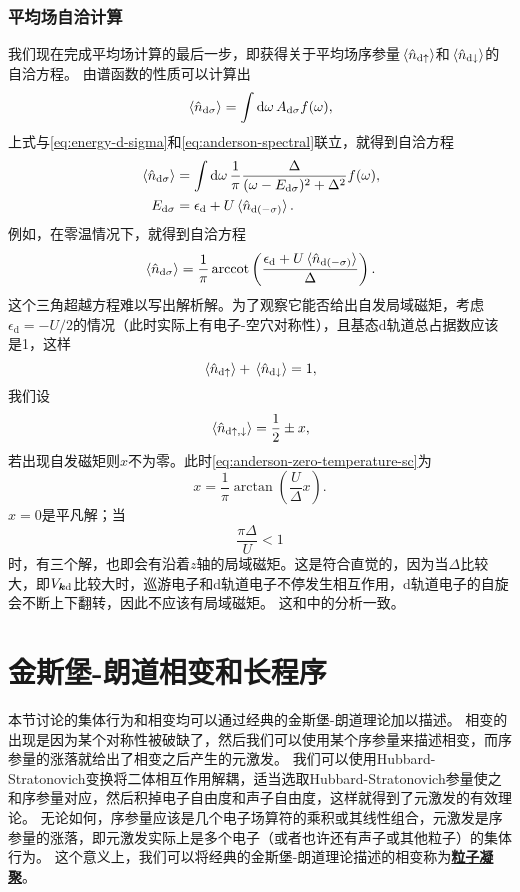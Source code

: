 \documentclass[hyperref, UTF8, a4paper]{ctexart}
\renewcommand{\autoref}{\prettyref}
\newcommand*{\concept}[1]{\underline{\textbf{#1}}}
\begin{document}
\subsubsection{平均场自洽计算}

我们现在完成平均场计算的最后一步，即获得关于平均场序参量$\expval*{\hat{n}_{\text{d} \uparrow}}$和$\expval*{\hat{n}_{\text{d} \downarrow}}$的自洽方程。
由谱函数的性质可以计算出
\[
    \expval*{\hat{n}_{\text{d} \sigma}} = \int \dd{\omega} A_{\text{d} \sigma} f(\omega),
\]
上式与\eqref{eq:energy-d-sigma}和\eqref{eq:anderson-spectral}联立，就得到自洽方程
\begin{equation}
    \begin{aligned}
        \expval*{\hat{n}_{\text{d} \sigma}} &= \int \dd{\omega} \frac{1}{\pi} \frac{\Delta}{(\omega-E_{\text{d}\sigma})^2 + \Delta^2} f(\omega), \\
        E_{\text{d} \sigma} &= \epsilon_\text{d} + U \expval*{\hat{n}_{\text{d} (-\sigma)}}.
    \end{aligned}
\end{equation}
例如，在零温情况下，就得到自洽方程
\begin{equation}
    \expval*{\hat{n}_{\text{d} \sigma}} = \frac{1}{\pi} \arccot \left( \frac{\epsilon_{\text{d}} + U \expval*{\hat{n}_{\text{d} (-\sigma)}}}{\Delta} \right).
    \label{eq:anderson-zero-temperature-sc}
\end{equation}
这个三角超越方程难以写出解析解。为了观察它能否给出自发局域磁矩，考虑$\epsilon_{\text{d}} = - U / 2$的情况（此时实际上有电子-空穴对称性），且基态d轨道总占据数应该是1，这样
\[
    \expval*{\hat{n}_{\text{d} \uparrow}} + \expval*{\hat{n}_{\text{d} \downarrow}} = 1,
\]
我们设
\[
    \expval*{\hat{n}_{\text{d} \uparrow, \downarrow}} = \frac{1}{2} \pm x,
\]
若出现自发磁矩则$x$不为零。此时\eqref{eq:anderson-zero-temperature-sc}为
\[
    x = \frac{1}{\pi} \arctan \left( \frac{U}{\Delta} x \right).
\]
$x=0$是平凡解；当
\[
    \frac{\pi \Delta}{U} < 1
\]
时，有三个解，也即会有沿着$z$轴的局域磁矩。这是符合直觉的，因为当$\Delta$比较大，即$V_{\vb*{k} \text{d}}$比较大时，巡游电子和d轨道电子不停发生相互作用，d轨道电子的自旋会不断上下翻转，因此不应该有局域磁矩。
这和\autoref{sec:anderson-model}中的分析一致。

\section{金斯堡-朗道相变和长程序}\label{sec:gl-transition}

本节讨论的集体行为和相变均可以通过经典的金斯堡-朗道理论加以描述。
相变的出现是因为某个对称性被破缺了，然后我们可以使用某个序参量来描述相变，而序参量的涨落就给出了相变之后产生的元激发。
我们可以使用Hubbard-Stratonovich变换将二体相互作用解耦，适当选取Hubbard-Stratonovich参量使之和序参量对应，然后积掉电子自由度和声子自由度，这样就得到了元激发的有效理论。
无论如何，序参量应该是几个电子场算符的乘积或其线性组合，元激发是序参量的涨落，即元激发实际上是多个电子（或者也许还有声子或其他粒子）的集体行为。
这个意义上，我们可以将经典的金斯堡-朗道理论描述的相变称为\concept{粒子凝聚}。
\end{document}
